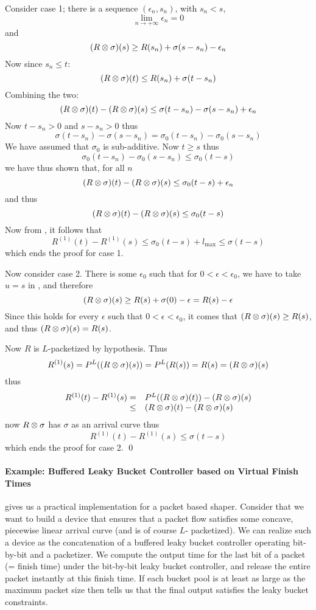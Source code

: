 Consider case 1; there is a sequence $(\epsilon_n, s_n)$, with
$s_n < s$,
$$\lim_{n\rightarrow + \infty} \epsilon_n =0$$
and
$$
(R \otimes \sigma)(s)  \geq R(s_n) + \sigma(s-s_n) - \epsilon_n
$$
Now since $s_n \leq t$:
$$
(R \otimes \sigma)(t) \leq R(s_n) + \sigma(t-s_n)
$$
Combining the two:
$$
(R \otimes \sigma)(t) - (R \otimes \sigma)(s) \leq \sigma(t-s_n)-
\sigma(s-s_n) + \epsilon_n
$$
Now $t-s_n >0$ and $s-s_n >0$ thus
$$\sigma(t-s_n) - \sigma(s-s_n) = \sigma_0(t-s_n) -
\sigma_0(s-s_n)
$$
We have assumed that $\sigma_0$ is sub-additive. Now $t \geq s$
thus
$$
\sigma_0(t-s_n) - \sigma_0(s-s_n) \leq \sigma_0(t-s)
$$
we have thus shown that, for all $n$
$$
 (R \otimes \sigma)(t) - (R \otimes \sigma)(s)
 \leq \sigma_0(t-s) + \epsilon_n
$$ and thus
$$
 (R \otimes \sigma)(t) - (R \otimes \sigma)(s) \leq \sigma_0(t-s)
$$
Now from , it follows that
$$
 R^{(1)}(t) -   R^{(1)}(s) \leq \sigma_0(t-s) + l_{\max}
 \leq \sigma(t-s)
$$
which ends the proof for case 1.

Now consider case 2. There is some $\epsilon_0$ such that for $0 <
\epsilon < \epsilon_0$, we have to take $u=s$ in , and therefore
$$
(R \otimes \sigma)(s)  \geq R(s) + \sigma(0) - \epsilon = R(s) - \epsilon
$$
Since this holds for every $\epsilon$ such that $0 <
\epsilon < \epsilon_0$, it comes that $(R \otimes \sigma)(s)\geq R(s)$, and thus $
(R \otimes \sigma)(s)  = R(s)
$.

Now $R$ is $L$-packetized by hypothesis. Thus
$$R^{(1)}(s)=P^L((R \otimes \sigma)(s))=
P^L(R (s)) =R(s) = (R \otimes \sigma)(s)$$ thus
$$
  \begin{array}{rl}
    R^{(1)}(t) - R^{(1)}(s)= & P^L((R \otimes \sigma)(t)) - (R \otimes
\sigma)(s) \\
     \leq & (R \otimes \sigma)(t) - (R \otimes \sigma)(s)
  \end{array}
$$
now $R \otimes \sigma$ has $\sigma$ as an arrival curve thus
$$
 R^{(1)}(t) - R^{(1)}(s) \leq \sigma(t-s)
$$
which ends the proof for case 2.
 \qed

\paragraph{Example: Buffered Leaky Bucket Controller based on
Virtual Finish Times}  gives us a practical
implementation for a packet based shaper. Consider that we want to
build a device that ensures that a packet flow satisfies some
concave, piecewise linear arrival curve (and is of course $L$-
packetized). We can realize such a device  as the concatenation of
a buffered leaky bucket controller operating bit-by-bit and a
packetizer.  We compute the output time for the last bit of a
packet (= finish time) under the bit-by-bit leaky bucket
controller, and release the entire packet instantly at this finish
time. If each bucket pool is at least as large as the maximum
packet size then  tells us that the final output
satisfies the leaky bucket constraints.

